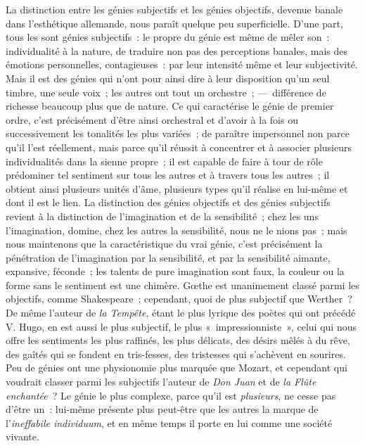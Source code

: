 \documentclass[french,twoside]{book} %
\begin{document}
La distinction entre les génies subjectifs et les génies objectifs, devenue banale dans l’esthétique allemande, nous paraît quelque peu superficielle. D’une part, tous les sont génies subjectifs : le propre du génie est même de mêler son : individualité à la nature, de traduire non pas des perceptions banales, mais des émotions personnelles, contagieuses : par leur intensité même et leur subjectivité. Mais il est des génies qui n’ont pour ainsi dire à leur disposition qu’un seul timbre, une seule voix ; les autres ont tout un orchestre ; — différence de richesse beaucoup plus que de nature. Ce qui caractérise le génie de premier ordre, c’est précisément d’être ainsi orchestral et d’avoir à la fois ou successivement les tonalités les plus variées ; de paraître impersonnel non parce qu’il l’est réellement, mais parce qu’il réussit à concentrer et à associer plusieurs individualités dans la sienne propre ; il est capable de faire à tour de rôle prédominer tel sentiment sur tous les autres et à travers tous les autres ; il obtient ainsi plusieurs unités d’âme, plusieurs types qu’il réalise en lui-même et dont il est le lien. La distinction des génies objectifs et des génies subjectifs revient à la distinction de l’imagination et de la sensibilité ; chez les uns l’imagination, domine, chez les autres la sensibilité, nous ne le nions pas ; mais nous maintenons que la caractéristique du vrai génie, c’est précisément la pénétration de l’imagination par la sensibilité, et par la sensibilité aimante, expansive, féconde ; les talents de pure imagination sont faux, la couleur ou la forme sans le sentiment est une chimère. Gœthe est unanimement classé parmi les objectifs, comme Shakespeare ; cependant, quoi de plus subjectif que Werther ? De même l’auteur de \emph{la Tempête}, étant le plus lyrique des poètes qui ont précédé V. Hugo, en est aussi le plus subjectif, le plus « impressionniste », celui qui nous offre les sentiments les plus raffinés, les plus délicats, des désirs mêlés à du rêve, des gaîtés qui se fondent en tris-fesses, des tristesses qui s’achèvent en sourires. Peu de génies ont une physionomie plus marquée que Mozart, et cependant qui voudrait classer parmi les subjectifs l’auteur de \emph{Don Juan} et de \emph{la Flûte enchantée} ? Le génie le plus complexe, parce qu’il est \emph{plusieurs}, ne cesse pas d’être un : lui-même présente plus peut-être que les autres la marque de l’\emph{ineffabile individuum}, et en même temps il porte en lui comme une société vivante.\par
\end{document}
